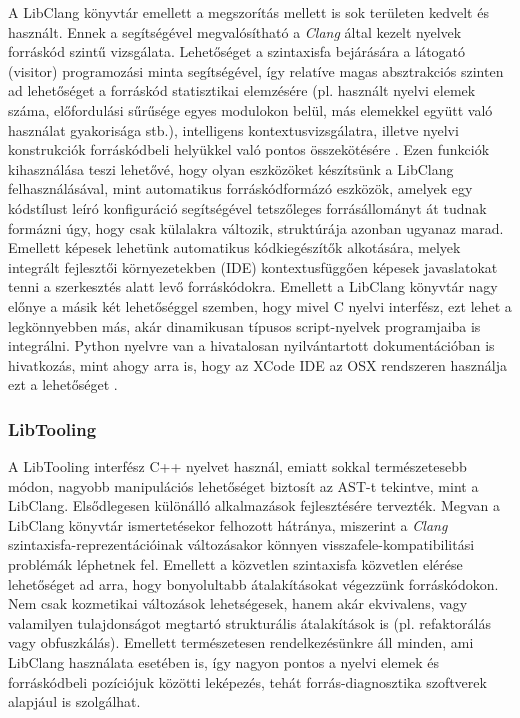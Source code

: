 \documentclass[a4paper,12pt]{report}
\begin{document}
A LibClang könyvtár emellett a megszorítás mellett is sok területen kedvelt és használt. Ennek a segítségével megvalósítható a \emph{Clang} által kezelt nyelvek forráskód szintű vizsgálata. Lehetőséget a szintaxisfa bejárására a látogató (visitor) programozási minta segítségével, így relatíve magas absztrakciós szinten ad lehetőséget a forráskód statisztikai elemzésére (pl. használt nyelvi elemek száma, előfordulási sűrűsége egyes modulokon belül, más elemekkel együtt való használat gyakorisága stb.), intelligens kontextusvizsgálatra, illetve nyelvi konstrukciók forráskódbeli helyükkel való pontos összekötésére \cite{libclangdocs}. Ezen funkciók kihasználása teszi lehetővé, hogy olyan eszközöket készítsünk a LibClang felhasználásával, mint automatikus forráskódformázó eszközök, amelyek egy kódstílust leíró konfiguráció segítségével tetszőleges forrásállományt át tudnak formázni úgy, hogy csak külalakra változik, struktúrája azonban ugyanaz marad. Emellett képesek lehetünk automatikus kódkiegészítők alkotására, melyek integrált fejlesztői környezetekben (IDE) kontextusfüggően képesek javaslatokat tenni a szerkesztés alatt levő forráskódokra. Emellett a LibClang könyvtár nagy előnye a másik két lehetőséggel szemben, hogy mivel C nyelvi interfész, ezt lehet a legkönnyebben más, akár dinamikusan típusos script-nyelvek programjaiba is integrálni. Python nyelvre van a hivatalosan nyilvántartott dokumentációban is hivatkozás, mint ahogy arra is, hogy az XCode IDE az OSX rendszeren használja ezt a lehetőséget \cite{clangtooling}.

\subsubsection{LibTooling}
A LibTooling interfész C++ nyelvet használ, emiatt sokkal természetesebb módon, nagyobb manipulációs lehetőséget biztosít az AST-t tekintve, mint a LibClang. Elsődlegesen különálló alkalmazások fejlesztésére tervezték. Megvan a LibClang könyvtár ismertetésekor felhozott hátránya, miszerint a \emph{Clang} szintaxisfa-reprezentációinak változásakor könnyen visszafele-kompatibilitási problémák léphetnek fel. Emellett a közvetlen szintaxisfa közvetlen elérése lehetőséget ad arra, hogy bonyolultabb átalakításokat végezzünk forráskódokon. Nem csak kozmetikai változások lehetségesek, hanem akár ekvivalens, vagy valamilyen tulajdonságot megtartó strukturális átalakítások is (pl. refaktorálás vagy obfuszkálás). Emellett természetesen rendelkezésünkre áll minden, ami LibClang használata esetében is, így nagyon pontos a nyelvi elemek és forráskódbeli pozíciójuk közötti leképezés, tehát forrás-diagnosztika szoftverek alapjául is szolgálhat.
\end{document}
